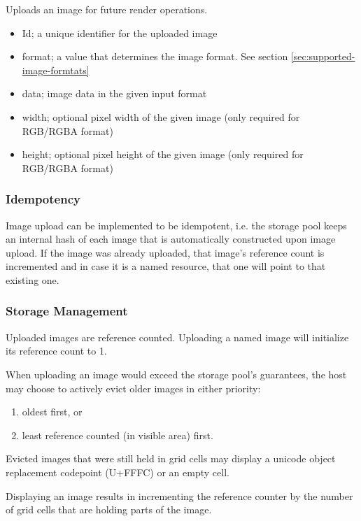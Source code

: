 \documentclass{article}
\begin{document}
Uploads an image for future render operations.

\begin{itemize}
    \item Id; a unique identifier for the uploaded image
    \item format; a value that determines the image format. See section \ref{sec:supported-image-formtats}
    \item data; image data in the given input format
    \item width; optional pixel width of the given image (only required for RGB/RGBA format)
    \item height; optional pixel height of the given image (only required for RGB/RGBA format)
\end{itemize}

\subsubsection{Idempotency}

Image upload can be implemented to be idempotent, i.e. the storage pool keeps an internal hash
of each image that is automatically constructed upon image upload.
If the image was already uploaded, that image's reference count is incremented
and in case it is a named resource, that one will point to that existing one.

\subsubsection{Storage Management}

Uploaded images are reference counted. Uploading a named image will initialize its reference count to 1.

When uploading an image would exceed the storage pool's guarantees,
the host may choose to actively evict older images in either priority:

\begin{enumerate}
    \item oldest first, or
    \item least reference counted (in visible area) first.
\end{enumerate}

Evicted images that were still held in grid cells may display a unicode object replacement
codepoint (U+FFFC) or an empty cell.

Displaying an image results in incrementing the reference counter by the number of grid cells
that are holding parts of the image.
\end{document}
